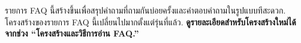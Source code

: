 \documentclass[12pt]{article}
\begin{document}
รายการ FAQ นี้สร้างขึ้นเพื่อสรุปคำถามที่ถามกันบ่อยครั้งและคำตอบคำถามในรูปแบบทีสะดวก.
โครงสร้างของรายการ FAQ นี้เปลี่ยนไปมากตั้งแต่รุ่นที่แล้ว.
\textbf{ดูรายละเอียดสำหรับโครงสร้างใหม่ได้จากช่วง ``โครงสร้างและวิธีการอ่าน
  FAQ.''}
\end{document}
